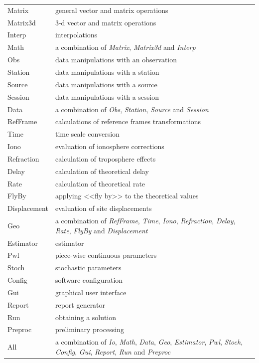 \documentclass [10pt,letterpaper]{report}
\begin{document}
{{\begin{table}[htb]
\begin{tabular}{lp{}}
Matrix          & general vector and matrix operations\\
Matrix3d        & 3-d vector and matrix operations\\
Interp          & interpolations\\
Math            & a combination of {\sl Matrix}, {\sl Matrix3d} and {\sl Interp}\\

Obs             & data manipulations with an observation\\
Station         & data manipulations with a station\\
Source          & data manipulations with a source\\
Session         & data manipulations with a session\\
Data            & a combination of {\sl Obs}, {\sl Station}, {\sl Source} and {\sl Session}\\

RefFrame        & calculations of reference frames transformations\\
Time            & time scale conversion\\
Iono            & evaluation of ionosphere corrections\\
Refraction      & calculation of troposphere effects\\
Delay           & calculation of theoretical delay\\
Rate            & calculation of theoretical rate\\
FlyBy           & applying <<fly by>> to the theoretical values \\
Displacement    & evaluation of site displacements\\
Geo             & a combination of {\sl RefFrame}, {\sl Time}, {\sl Iono}, {\sl Refraction},
    {\sl Delay}, {\sl Rate}, {\sl FlyBy} and {\sl Displacement}\\

Estimator       & estimator\\
Pwl             & piece-wise continuous parameters\\
Stoch           & stochastic parameters\\
Config          & software configuration\\
Gui             & graphical user interface\\
Report          & report generator\\
Run             & obtaining a solution\\
Preproc         & preliminary processing\\
All             & a combination of {\sl Io}, {\sl Math}, {\sl Data}, {\sl Geo}, {\sl Estimator},
    {\sl Pwl}, {\sl Stoch}, {\sl Config}, {\sl Gui}, {\sl Report}, {\sl Run} and {\sl Preproc}\\


\end{tabular}
\end{table}}}
\end{document}
